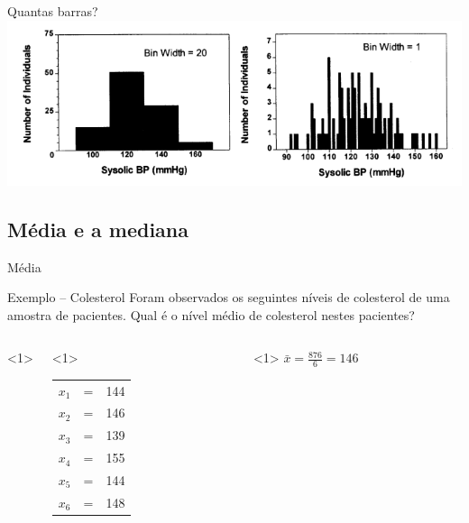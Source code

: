 \documentclass{beamer}
\begin{document}
\begin{frame}{\scriptsize Quantas barras?}
  \includegraphics[width=\textwidth]{Cap3/histograma2}
\end{frame}

\subsection{Média e a mediana}

\begin{frame}{\scriptsize Média}
  \begin{exampleblock}{Exemplo -- Colesterol}
    \footnotesize
    Foram observados os seguintes níveis de colesterol de uma amostra
    de pacientes. Qual é o nível médio de colesterol nestes pacientes?

    \bigskip
    \begin{columns}<1>
      \begin{column}{5cm}<1>
        {\tiny
        \begin{tabular}{ccc}
          $x_1$ &=&144\\
          $x_2$ &=&146\\
          $x_3$ &=&139\\
          $x_4$ &=&155\\
          $x_5$ &=&144\\
          $x_6$ &=&148\\
        \end{tabular}
        }
      \end{column}
      \begin{column}{5cm}<1>
        \scriptsize
        $\bar{x} = \frac{876}{6} = 146 $
      \end{column}
    \end{columns}
  \end{exampleblock}
\end{frame}
\end{document}
